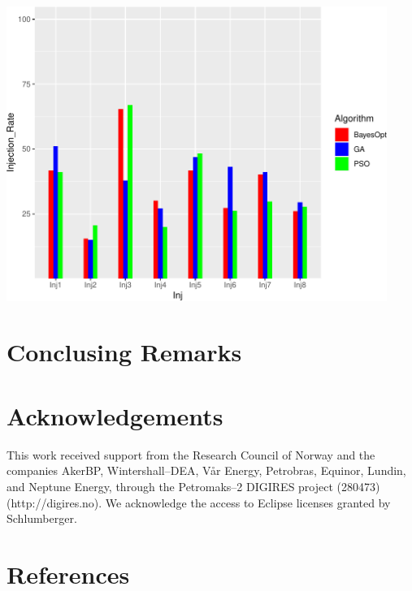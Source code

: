 \documentclass[]{elsarticle} %
\begin{document}
\begin{center}\includegraphics[width=468px]{0_Paper1_main_files/figure-latex/unnamed-chunk-14-1} \end{center}

\newpage

\hypertarget{conclusing-remarks}{%
\section{Conclusing Remarks}\label{conclusing-remarks}}

\newpage

\hypertarget{acknowledgements}{%
\section{Acknowledgements}\label{acknowledgements}}

This work received support from the Research Council of Norway and the companies AkerBP, Wintershall--DEA, Vår Energy, Petrobras, Equinor, Lundin, and Neptune Energy, through the Petromaks--2 DIGIRES project (280473) (http://digires.no). We acknowledge the access to Eclipse licenses granted by Schlumberger.

\newpage

\hypertarget{references}{%
\section*{References}\label{references}}
\end{document}
